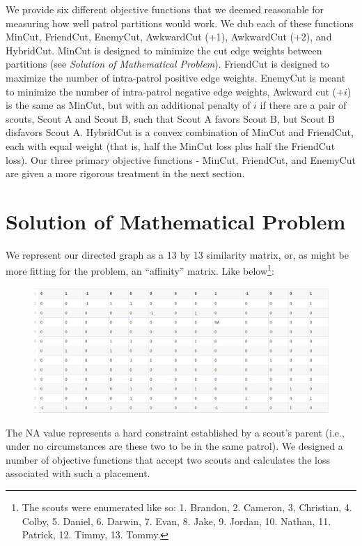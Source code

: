 \documentclass{amsart}
\theoremstyle{definition}
\theoremstyle{remark}
\numberwithin{equation}{section}
\begin{document}
We provide six different objective functions that we deemed reasonable for measuring how well patrol partitions would work. We dub each of these functions MinCut, FriendCut, EnemyCut, AwkwardCut (+1), AwkwardCut (+2), and HybridCut. MinCut is designed to minimize the cut edge weights between partitions (see \textit{Solution of Mathematical Problem}). FriendCut is designed to maximize the number of intra-patrol positive edge weights. EnemyCut is meant to minimize the number of intra-patrol negative edge weights, Awkward cut ($+i$) is the same as MinCut, but with an additional penalty of $i$ if there are a pair of scouts, Scout A and Scout B, such that Scout A favors Scout B, but Scout B disfavors Scout A. HybridCut is a convex combination of MinCut and FriendCut, each with equal weight (that is, half the MinCut loss plus half the FriendCut loss). Our three primary objective functions - MinCut, FriendCut, and EnemyCut are given a more rigorous treatment in the next section.

\section*{Solution of Mathematical Problem}
We represent our directed graph as a 13 by 13 similarity matrix, or, as might
be more fitting for the problem, an ``affinity'' matrix. Like below\footnote{The scouts were enumerated like so: 1. Brandon, 2. Cameron, 3, Christian, 4. Colby, 5. Daniel, 6. Darwin, 7. Evan, 8. Jake, 9. Jordan, 10. Nathan, 11. Patrick, 12. Timmy, 13. Tommy.}:

\begin{figure}[h]
    \centering
    \includegraphics[scale=0.28]{data}
\end{figure}

The NA value represents a hard constraint established by a scout's parent (i.e., under no circumstances are these two to be in the same patrol). We designed a number of objective functions that accept two scouts and calculates the loss associated with such a placement.
\end{document}
